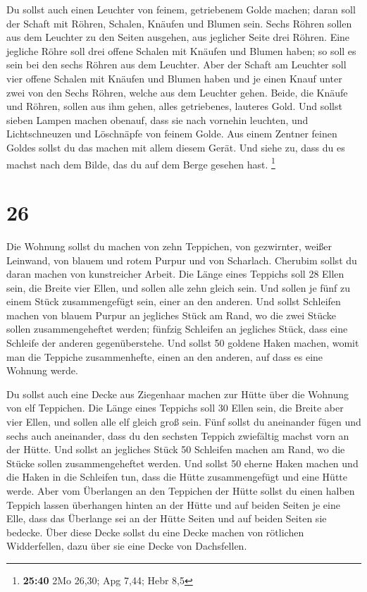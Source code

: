  Du sollst auch einen Leuchter von feinem, getriebenem
Golde machen; daran soll der Schaft mit Röhren, Schalen, Knäufen und
Blumen sein.  Sechs Röhren sollen aus dem Leuchter zu den
Seiten ausgehen, aus jeglicher Seite drei Röhren.  Eine
jegliche Röhre soll drei offene Schalen mit Knäufen und Blumen haben; so
soll es sein bei den sechs Röhren aus dem Leuchter.  Aber
der Schaft am Leuchter soll vier offene Schalen mit Knäufen und Blumen
haben  und je einen Knauf unter zwei von den Sechs Röhren,
welche aus dem Leuchter gehen.  Beide, die Knäufe und
Röhren, sollen aus ihm gehen, alles getriebenes, lauteres Gold.
 Und sollst sieben Lampen machen obenauf, dass sie nach
vornehin leuchten,  und Lichtschneuzen und Löschnäpfe von
feinem Golde.  Aus einem Zentner feinen Goldes sollst du
das machen mit allem diesem Gerät.  Und siehe zu, dass du
es machst nach dem Bilde, das du auf dem Berge gesehen hast. \footnote{\textbf{25:40}
  2Mo 26,30; Apg 7,44; Hebr 8,5}

\hypertarget{section-7}{%
\section{26}\label{section-7}}

 Die Wohnung sollst du machen von zehn Teppichen, von
gezwirnter, weißer Leinwand, von blauem und rotem Purpur und von
Scharlach. Cherubim sollst du daran machen von kunstreicher Arbeit.
 Die Länge eines Teppichs soll 28 Ellen sein, die Breite
vier Ellen, und sollen alle zehn gleich sein.  Und sollen je
fünf zu einem Stück zusammengefügt sein, einer an den anderen.
 Und sollst Schleifen machen von blauem Purpur an jegliches
Stück am Rand, wo die zwei Stücke sollen zusammengeheftet werden;
 fünfzig Schleifen an jegliches Stück, dass eine Schleife
der anderen gegenüberstehe.  Und sollst 50 goldene Haken
machen, womit man die Teppiche zusammenhefte, einen an den anderen, auf
dass es eine Wohnung werde.

 Du sollst auch eine Decke aus Ziegenhaar machen zur Hütte
über die Wohnung von elf Teppichen.  Die Länge eines
Teppichs soll 30 Ellen sein, die Breite aber vier Ellen, und sollen alle
elf gleich groß sein.  Fünf sollst du aneinander fügen und
sechs auch aneinander, dass du den sechsten Teppich zwiefältig machst
vorn an der Hütte.  Und sollst an jegliches Stück 50
Schleifen machen am Rand, wo die Stücke sollen zusammengeheftet werden.
 Und sollst 50 eherne Haken machen und die Haken in die
Schleifen tun, dass die Hütte zusammengefügt und eine Hütte werde.
 Aber vom Überlangen an den Teppichen der Hütte sollst du
einen halben Teppich lassen überhangen hinten an der Hütte 
und auf beiden Seiten je eine Elle, dass das Überlange sei an der Hütte
Seiten und auf beiden Seiten sie bedecke.  Über diese Decke
sollst du eine Decke machen von rötlichen Widderfellen, dazu über sie
eine Decke von Dachsfellen.


